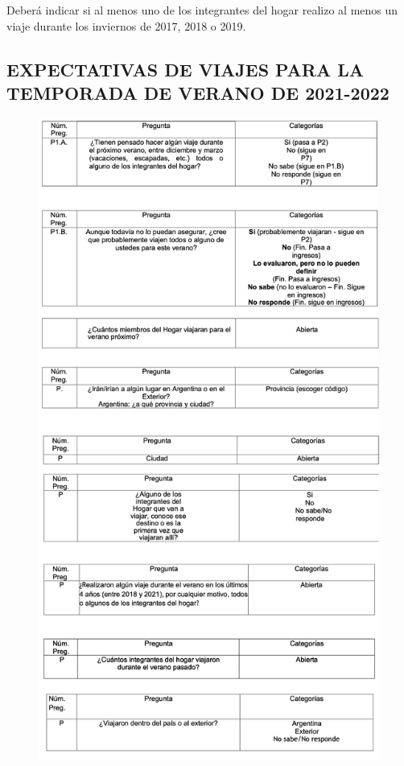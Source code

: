 \documentclass[
  openany]{book}
\begin{document}
Deberá indicar si al menos uno de los integrantes del hogar realizo al menos un viaje durante los inviernos de 2017, 2018 o 2019.

\hypertarget{expectativas-de-viajes-para-la-temporada-de-verano-de-2021-2022}{%
\subsection{\texorpdfstring{\textbf{EXPECTATIVAS DE VIAJES PARA LA TEMPORADA DE VERANO DE 2021-2022}}{EXPECTATIVAS DE VIAJES PARA LA TEMPORADA DE VERANO DE 2021-2022}}\label{expectativas-de-viajes-para-la-temporada-de-verano-de-2021-2022}}

\begin{figure}

{\centering \includegraphics[width=1\linewidth]{imagenes/figura6-317} 

}

\end{figure}

  
\end{document}
